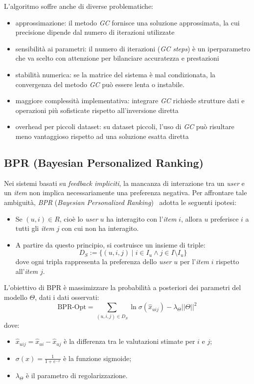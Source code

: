 L'algoritmo soffre anche di diverse problematiche:

\begin{itemize}
    \item approssimazione: il metodo \textit{GC} fornisce una soluzione approssimata, la cui precisione dipende dal numero di iterazioni utilizzate
    \item sensibilità ai parametri: il numero di iterazioni (\textit{GC steps}) è un iperparametro che va scelto con attenzione per bilanciare accuratezza e prestazioni
    \item stabilità numerica: se la matrice del sistema è mal condizionata, la convergenza del metodo \textit{GC} può essere lenta o instabile.
    \item maggiore complessità implementativa: integrare \textit{GC} richiede strutture dati e operazioni più sofisticate rispetto all'inversione diretta
    \item overhead per piccoli dataset: su dataset piccoli, l'uso di \textit{GC} può risultare meno vantaggioso rispetto ad una soluzione esatta diretta
\end{itemize}

\subsection{BPR (Bayesian Personalized Ranking)}\label{bpr}

Nei sistemi basati su \textit{feedback impliciti}, la mancanza di interazione tra un \textit{user} e un \textit{item} non implica necessariamente una preferenza negativa. Per affrontare tale ambiguità, \textit{BPR} (\textit{Bayesian Personalized Ranking})~\cite{BPR} adotta le seguenti ipotesi:

\begin{itemize}
    \item Se $(u, i) \in R$, cioè lo \textit{user} $u$ ha interagito con l'\textit{item} $i$, allora $u$ preferisce $i$ a tutti gli \textit{item} $j$ con cui non ha interagito.
    \item A partire da questo principio, si costruisce un insieme di triple:
    \[
    D_S := \{(u, i, j) \mid i \in I_u \wedge j \in I \setminus I_u\}
    \]
    dove ogni tripla rappresenta la preferenza dello \textit{user} $u$ per l'\textit{item} $i$ rispetto all'\textit{item} $j$.
\end{itemize}

L'obiettivo di BPR è massimizzare la probabilità a posteriori dei parametri del modello $\Theta$, dati i dati osservati:
\[
\text{BPR-Opt} = \sum_{(u, i, j) \in D_S} \ln \sigma(\hat{x}_{uij}) - \lambda_\Theta ||\Theta||^2
\]
dove:
\begin{itemize}
    \item $\hat{x}_{uij} = \hat{x}_{ui} - \hat{x}_{uj}$ è la differenza tra le valutazioni stimate per $i$ e $j$;
    \item $\sigma(x) = \frac{1}{1 + e^{-x}}$ è la funzione sigmoide;
    \item $\lambda_\Theta$ è il parametro di regolarizzazione.
\end{itemize}

